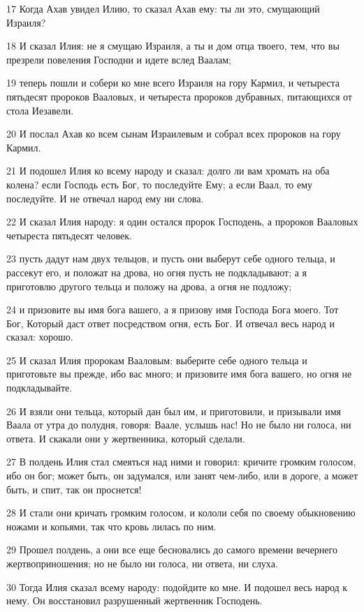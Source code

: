 \par 17 Когда Ахав увидел Илию, то сказал Ахав ему: ты ли это, смущающий Израиля?
\par 18 И сказал Илия: не я смущаю Израиля, а ты и дом отца твоего, тем, что вы презрели повеления Господни и идете вслед Ваалам;
\par 19 теперь пошли и собери ко мне всего Израиля на гору Кармил, и четыреста пятьдесят пророков Вааловых, и четыреста пророков дубравных, питающихся от стола Иезавели.
\par 20 И послал Ахав ко всем сынам Израилевым и собрал всех пророков на гору Кармил.
\par 21 И подошел Илия ко всему народу и сказал: долго ли вам хромать на оба колена? если Господь есть Бог, то последуйте Ему; а если Ваал, то ему последуйте. И не отвечал народ ему ни слова.
\par 22 И сказал Илия народу: я один остался пророк Господень, а пророков Вааловых четыреста пятьдесят человек.
\par 23 пусть дадут нам двух тельцов, и пусть они выберут себе одного тельца, и рассекут его, и положат на дрова, но огня пусть не подкладывают; а я приготовлю другого тельца и положу на дрова, а огня не подложу;
\par 24 и призовите вы имя бога вашего, а я призову имя Господа Бога моего. Тот Бог, Который даст ответ посредством огня, есть Бог. И отвечал весь народ и сказал: хорошо.
\par 25 И сказал Илия пророкам Вааловым: выберите себе одного тельца и приготовьте вы прежде, ибо вас много; и призовите имя бога вашего, но огня не подкладывайте.
\par 26 И взяли они тельца, который дан был им, и приготовили, и призывали имя Ваала от утра до полудня, говоря: Ваале, услышь нас! Но не было ни голоса, ни ответа. И скакали они у жертвенника, который сделали.
\par 27 В полдень Илия стал смеяться над ними и говорил: кричите громким голосом, ибо он бог; может быть, он задумался, или занят чем-либо, или в дороге, а может быть, и спит, так он проснется!
\par 28 И стали они кричать громким голосом, и кололи себя по своему обыкновению ножами и копьями, так что кровь лилась по ним.
\par 29 Прошел полдень, а они все еще бесновались до самого времени вечернего жертвоприношения; но не было ни голоса, ни ответа, ни слуха.
\par 30 Тогда Илия сказал всему народу: подойдите ко мне. И подошел весь народ к нему. Он восстановил разрушенный жертвенник Господень.
